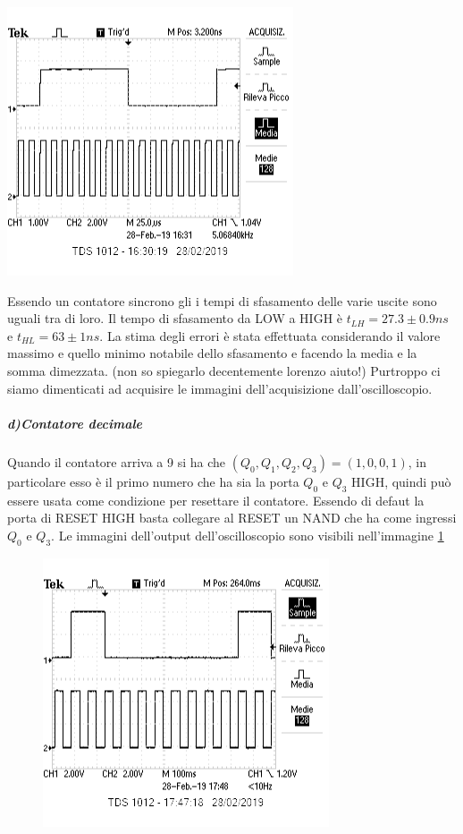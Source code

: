 \documentclass{article}
\begin{document}
	\begin{minipage}{.5\linewidth}
		\centering
		\includegraphics[width=\linewidth]{immagini/f1_16}
		\label{fig:f1_16}
	\end{minipage}\newline
	Essendo un contatore sincrono gli i tempi di sfasamento delle varie uscite sono uguali tra di loro. Il tempo di sfasamento da LOW a HIGH è $t_{LH}=27.3\pm0.9ns$ e $t_{HL}=63\pm1ns$. La stima degli errori è stata effettuata considerando il valore massimo e quello minimo notabile dello sfasamento e facendo la media e la somma dimezzata. (non so spiegarlo decentemente lorenzo aiuto!)\newline
	Purtroppo ci siamo dimenticati ad acquisire le immagini dell'acquisizione dall'oscilloscopio.\newline
	\subparagraph{d)Contatore decimale}
		Quando il contatore arriva a 9 si ha che $(Q_0,Q_1,Q_2,Q_3)=(1,0,0,1)$, in particolare esso è il primo numero che ha sia la porta $Q_0$ e $Q_3$ HIGH, quindi può essere usata come condizione per resettare il contatore. Essendo di defaut la porta di RESET HIGH basta collegare al RESET un NAND che ha come ingressi $Q_0$ e $Q_3$.\newline
		Le immagini dell'output dell'oscilloscopio sono visibili nell'immagine \ref{fig:3d}
		\begin{figure}
		\begin{center}
			\includegraphics[width=0.5\linewidth]{immagini/3d}
			\label{fig:3d}
		\end{center}
		\end{figure}
\end{document}
